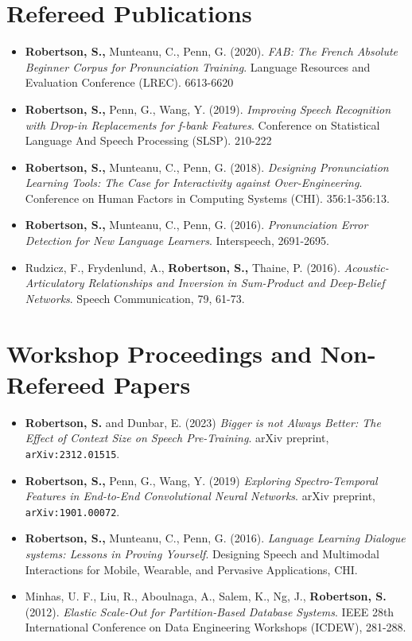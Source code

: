 \documentclass[11pt,a4paper,sans]{moderncv}        %
\begin{document}
\section{Refereed Publications}
\begin{itemize}
  \item \textbf{Robertson, S.,} Munteanu, C., Penn, G. (2020).
    \textit{FAB: The French Absolute Beginner Corpus for Pronunciation
    Training}. Language Resources and Evaluation Conference (LREC). 6613-6620

  \item \textbf{Robertson, S.,} Penn, G., Wang, Y. (2019).
    \textit{Improving Speech Recognition with Drop-in Replacements for f-bank
    Features}. Conference on Statistical Language And Speech Processing
    (SLSP). 210-222

  \item \textbf{Robertson, S.,} Munteanu, C., Penn, G. (2018).
    \textit{Designing Pronunciation Learning Tools: The Case for Interactivity
    against Over-Engineering}. Conference on Human Factors in Computing Systems
    (CHI). 356:1-356:13.

  \item \textbf{Robertson, S.,} Munteanu, C., Penn, G. (2016).
    \textit{Pronunciation Error Detection for New Language Learners}.
    Interspeech, 2691-2695.

  \item Rudzicz, F., Frydenlund, A., \textbf{Robertson, S.,} Thaine, P. (2016).
    \textit{Acoustic-Articulatory Relationships and Inversion in Sum-Product
    and Deep-Belief Networks}. Speech Communication, 79, 61-73.
\end{itemize}


\section{Workshop Proceedings and Non-Refereed Papers}
\begin{itemize}
  \item \textbf{Robertson, S.} and Dunbar, E. (2023) \textit{Bigger is not
    Always Better: The Effect of Context Size on Speech Pre-Training}. arXiv
    preprint, \texttt{arXiv:2312.01515}.

  \item \textbf{Robertson, S.,} Penn, G., Wang, Y. (2019) \textit{Exploring
    Spectro-Temporal Features in End-to-End Convolutional Neural Networks}.
    arXiv preprint, \texttt{arXiv:1901.00072}.

  \item \textbf{Robertson, S.,} Munteanu, C., Penn, G. (2016).
    \textit{Language Learning Dialogue systems: Lessons in Proving Yourself}.
    Designing Speech and Multimodal Interactions for Mobile, Wearable, and
    Pervasive Applications, CHI.

  \item Minhas, U. F., Liu, R., Aboulnaga, A., Salem, K., Ng, J.,
    \textbf{Robertson, S.} (2012). \textit{Elastic Scale-Out for
    Partition-Based Database Systems}. IEEE 28th International Conference on
    Data Engineering Workshops (ICDEW), 281-288.
\end{itemize}
\end{document}
